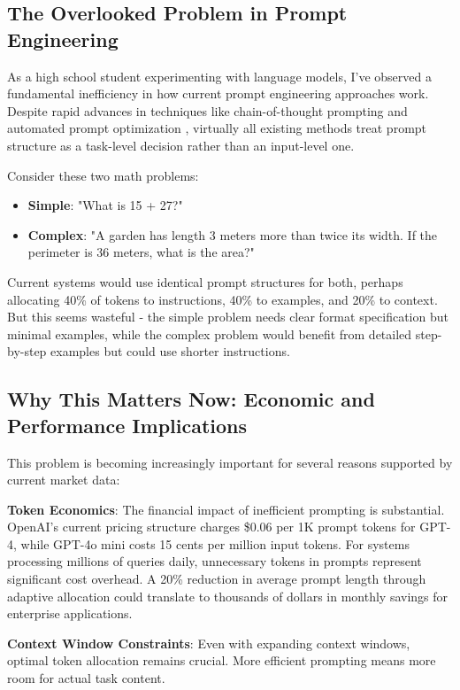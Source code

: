 \documentclass[11pt,a4paper]{article}
\begin{document}
\subsection{The Overlooked Problem in Prompt Engineering}

As a high school student experimenting with language models, I've observed a fundamental inefficiency in how current prompt engineering approaches work. Despite rapid advances in techniques like chain-of-thought prompting \citep{wei2022chain} and automated prompt optimization \citep{shin2020autoprompt}, virtually all existing methods treat prompt structure as a task-level decision rather than an input-level one.

Consider these two math problems:
\begin{itemize}
\item \textbf{Simple}: "What is 15 + 27?"
\item \textbf{Complex}: "A garden has length 3 meters more than twice its width. If the perimeter is 36 meters, what is the area?"
\end{itemize}

Current systems would use identical prompt structures for both, perhaps allocating 40\% of tokens to instructions, 40\% to examples, and 20\% to context. But this seems wasteful - the simple problem needs clear format specification but minimal examples, while the complex problem would benefit from detailed step-by-step examples but could use shorter instructions.

\subsection{Why This Matters Now: Economic and Performance Implications}

This problem is becoming increasingly important for several reasons supported by current market data:

\textbf{Token Economics}: The financial impact of inefficient prompting is substantial. OpenAI's current pricing structure charges \$0.06 per 1K prompt tokens for GPT-4, while GPT-4o mini costs 15 cents per million input tokens. For systems processing millions of queries daily, unnecessary tokens in prompts represent significant cost overhead. A 20\% reduction in average prompt length through adaptive allocation could translate to thousands of dollars in monthly savings for enterprise applications.

\textbf{Context Window Constraints}: Even with expanding context windows, optimal token allocation remains crucial. More efficient prompting means more room for actual task content.
\end{document}

